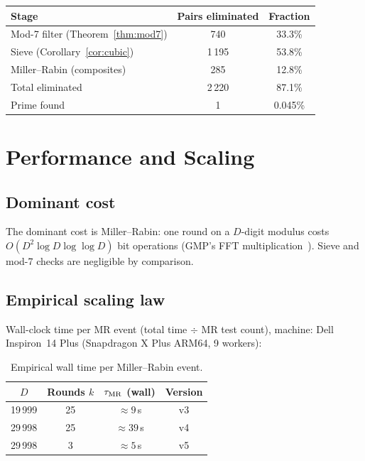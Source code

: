 \documentclass[11pt,a4paper]{article}
\theoremstyle{plain}
\theoremstyle{definition}
\begin{document}
\noindent
\begin{minipage}{\linewidth}
\centering
{}
\label{tab:filter-stats}
\begin{tabular}{l c c}
\toprule
Stage                              & Pairs eliminated & Fraction \\
\midrule
Mod-7 filter (Theorem~\ref{thm:mod7})    & 740     & 33.3\% \\
Sieve (Corollary~\ref{cor:cubic})        & 1\,195  & 53.8\% \\
Miller--Rabin (composites)               & 285     & 12.8\% \\
\midrule
Total eliminated                         & 2\,220  & 87.1\% \\
Prime found                              & 1       & 0.045\% \\
\bottomrule
\end{tabular}
\end{minipage}

\medskip

\section{Performance and Scaling}
\label{sec:performance}

\subsection{Dominant cost}

The dominant cost is Miller--Rabin: one round on a $D$-digit modulus costs
$O(D^2 \log D \log \log D)$ bit operations (GMP's FFT
multiplication~\cite{gmp}). Sieve and mod-7 checks are negligible by
comparison.

\subsection{Empirical scaling law}

Wall-clock time per MR event (total time $\div$ MR test count), machine: Dell
Inspiron~14 Plus (Snapdragon X Plus ARM64, 9 workers):

\begin{table}[ht]
\centering
\caption{Empirical wall time per Miller--Rabin event.}
\label{tab:scaling}
\begin{tabular}{c c c c}
\toprule
$D$ & Rounds $k$ & $\tau_{\rm MR}$ (wall) & Version \\
\midrule
19\,999 & 25 & $\approx 9$\,s  & v3 \\
29\,998 & 25 & $\approx 39$\,s & v4 \\
29\,998 & 3  & $\approx 5$\,s  & v5 \\
\bottomrule
\end{tabular}
\end{table}
\end{document}
